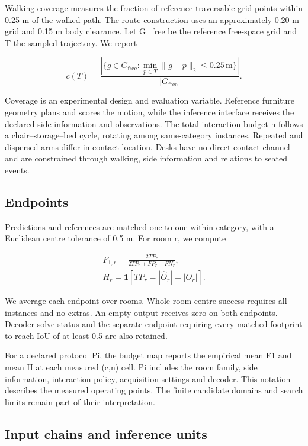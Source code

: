 \documentclass[10pt,twocolumn,letterpaper]{article}
\begin{document}
Walking coverage measures the fraction of reference traversable grid
points within 0.25 m of the walked path. The route construction uses an
approximately 0.20 m grid and 0.15 m body clearance. Let G\_free be the
reference free-space grid and T the sampled trajectory. We report

\[c(T)=\frac{|\{g\in G_{\mathrm{free}}:\min_{p\in T}\|g-p\|_2\leq0.25\,\mathrm{m}\}|}{|G_{\mathrm{free}}|}.\]

Coverage is an experimental design and evaluation variable. Reference
furniture geometry plans and scores the motion, while the inference
interface receives the declared side information and observations. The
total interaction budget n follows a chair--storage--bed cycle, rotating
among same-category instances. Repeated and dispersed arms differ in
contact location. Desks have no direct contact channel and are
constrained through walking, side information and relations to seated
events.

\subsection{Endpoints}\label{endpoints}

Predictions and references are matched one to one within category, with
a Euclidean centre tolerance of 0.5 m. For room r, we compute

\[\begin{gathered}F_{1,r}=\frac{2TP_r}{2TP_r+FP_r+FN_r},\\[4pt]H_r=\mathbf{1}[TP_r=|\widehat{O}_r|=|O_r|].\end{gathered}\]

We average each endpoint over rooms. Whole-room centre success requires
all instances and no extras. An empty output receives zero on both
endpoints. Decoder solve status and the separate endpoint requiring
every matched footprint to reach IoU of at least 0.5 are also retained.

For a declared protocol Pi, the budget map reports the empirical mean F1
and mean H at each measured (c,n) cell. Pi includes the room family,
side information, interaction policy, acquisition settings and decoder.
This notation describes the measured operating points. The finite
candidate domains and search limits remain part of their interpretation.

\subsection{Input chains and inference
units}\label{input-chains-and-inference-units}
\end{document}
